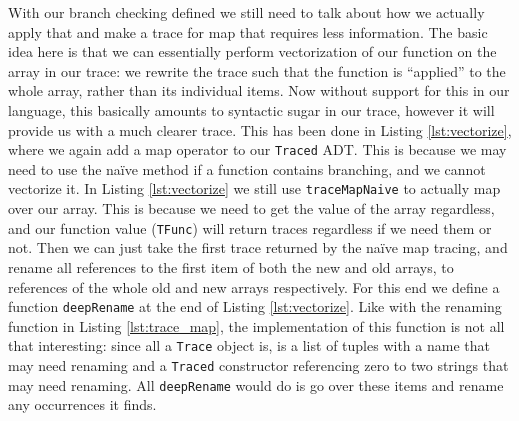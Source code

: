         With our branch checking defined we still need to talk about how we actually apply that and make a trace for map that requires less information.
        The basic idea here is that we can essentially perform vectorization of our function on the array in our trace: we rewrite the trace such that the function is ``applied'' to the whole array, rather than its individual items.
        Now without support for this in our language, this basically amounts to syntactic sugar in our trace, however it will provide us with a much clearer trace.
        This has been done in Listing \ref{lst:vectorize}, where we again add a map operator to our \texttt{Traced} ADT.
        This is because we may need to use the naïve method if a function contains branching, and we cannot vectorize it.
        In Listing \ref{lst:vectorize} we still use \texttt{traceMapNaive} to actually map over our array.
        This is because we need to get the value of the array regardless, and our function value (\texttt{TFunc}) will return traces regardless if we need them or not.
        Then we can just take the first trace returned by the naïve map tracing, and rename all references to the first item of both the new and old arrays, to references of the whole old and new arrays respectively.
        For this end we define a function \texttt{deepRename} at the end of Listing \ref{lst:vectorize}.
        Like with the renaming function in Listing \ref{lst:trace_map}, the implementation of this function is not all that interesting: since all a \texttt{Trace} object is, is a list of tuples with a name that may need renaming and a \texttt{Traced} constructor referencing zero to two strings that may need renaming.
        All \texttt{deepRename} would do is go over these items and rename any occurrences it finds.

